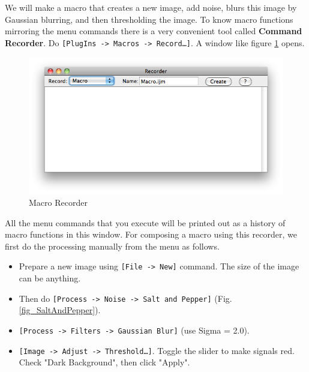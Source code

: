 \documentclass[11pt,a4paper,oneside]{report}
\newcommand{\ijmenu}[1]{\texttt{\small#1}}
\begin{document}
We will make a macro that creates a new image, add noise, blurs this image by
Gaussian blurring, and then thresholding the image. To know macro functions mirroring the menu commands 
there is a very convenient tool called \textbf{Command Recorder}. 
Do \ijmenu{[PlugIns -> Macros -> Record\ldots]}. A window like figure
\ref{fig_macroRecorderBlank} opens.

\begin{figure}[htbp]
\begin{center}
\includegraphics[scale=0.6]{fig/MacroRecorderBlank.png}
\caption{Macro Recorder} \label{fig_macroRecorderBlank}
\end{center}
\end{figure}

All the menu commands that you execute will be printed out as a history of macro functions in this window. For composing a macro using this recorder, we first do the processing manually from the menu as follows. 
\begin{itemize}
  \item Prepare a new image using \ijmenu{[File -> New]} command. The size of the image can be anything.
  \item Then do \ijmenu{[Process -> Noise -> Salt and Pepper]} (Fig.
  \ref{fig_SaltAndPepper}).
  \item \ijmenu{[Process -> Filters -> Gaussian Blur]} (use Sigma = 2.0).
  \item \ijmenu{[Image -> Adjust -> Threshold\ldots]}. Toggle the slider to make
  signals red. Check "Dark Background", then click "Apply".
\end{itemize}
 
\end{document}
